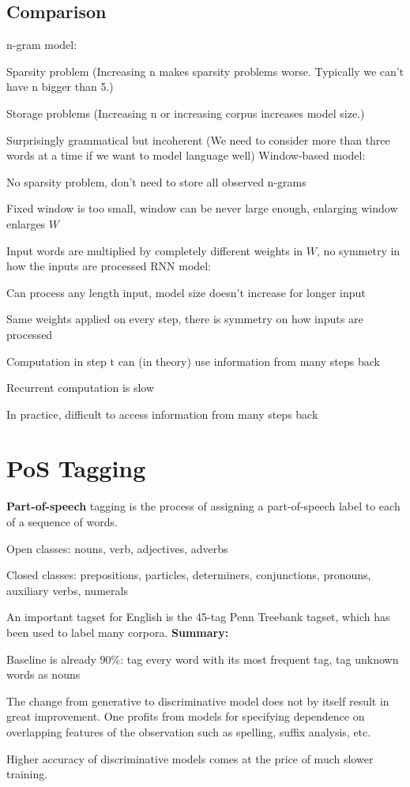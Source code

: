 \documentclass[12pt]{article}
\begin{document}
\subsection{Comparison}
n-gram model:
\ulb
\item Sparsity problem (Increasing n makes sparsity problems worse. Typically we can’t have n bigger than 5.)
\item Storage problems (Increasing n or increasing corpus increases model size.)
\item Surprisingly grammatical but incoherent (We need to consider more than three words at a time if we want to model language well)
\ule
Window-based model:
\ulb
\item No sparsity problem, don't need to store all observed n-grams
\item Fixed window is too small, window can be never large enough, enlarging window enlarges $W$
\item Input words are multiplied by completely different weights in $W$, no symmetry in how the inputs are processed
\ule
RNN model:
\ulb
\item Can process any length input, model size doesn't increase for longer input
\item Same weights applied on every step, there is symmetry on how inputs are processed
\item Computation in step t can (in theory) use information from many steps back
\item Recurrent computation is slow
\item In practice, difficult to access information from many steps back
\ule

\section{PoS Tagging}

\par \textbf{Part-of-speech }tagging is the process of assigning a part-of-speech label to each of a sequence of words.
\ulb
\item Open classes: nouns, verb, adjectives, adverbs
\item Closed classes: prepositions, particles, determiners, conjunctions, pronouns, auxiliary verbs, numerals
\item An important tagset for English is the 45-tag Penn Treebank tagset, which has been used to label many corpora.
\ule
\textbf{Summary:}
\ulb
\item Baseline is already $90\%$: tag every word with its most frequent tag, tag unknown words as nouns
\item The change from generative to discriminative model does not by itself result in great improvement. One profits from models for specifying dependence on overlapping features of the observation such as spelling, suffix analysis, etc.
\item Higher accuracy of discriminative models comes at the price of much slower training.
\ule
\end{document}

